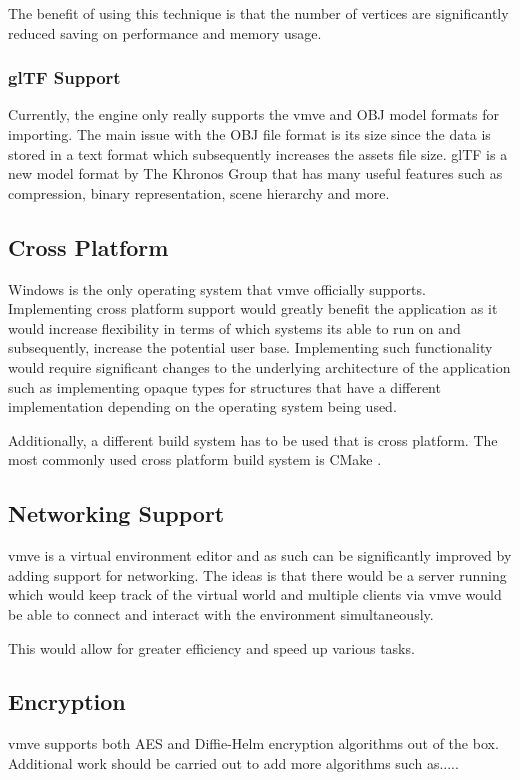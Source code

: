 \documentclass[11pt]{article}
\begin{document}
The benefit of using this technique is that the number of vertices are
significantly reduced saving on performance and memory usage.


\subsubsection{glTF Support}
Currently, the engine only really supports the \gls{vmve} and OBJ model formats for
importing. The main issue with the OBJ file format is its size since the data is
stored in a text format which subsequently increases the assets file size. glTF
\cite{gltf} is a new model format by The Khronos Group that has many useful
features such as compression, binary representation, scene hierarchy and more.

\subsection{Cross Platform}
Windows is the only operating system that \gls{vmve} officially supports.
Implementing cross platform support would greatly benefit the application as it
would increase flexibility in terms of which systems its able to run on and
subsequently, increase the potential user base. Implementing such functionality
would require significant changes to the underlying architecture of the
application such as implementing opaque types for structures that have a
different implementation depending on the operating system being used.

Additionally, a different build system has to be used that is cross platform.
The most commonly used cross platform build system is CMake \cite{cmake}.

\subsection{Networking Support}
\gls{vmve} is a virtual environment editor and as such can be significantly
improved by adding support for networking. The ideas is that there would be a
server running which would keep track of the virtual world and multiple clients
via \gls{vmve} would be able to connect and interact with the environment
simultaneously.

This would allow for greater efficiency and speed up various tasks.

\subsection{Encryption}
\gls{vmve} supports both AES and Diffie-Helm encryption algorithms out of the box.
Additional work should be carried out to add more algorithms such as.....
\end{document}
